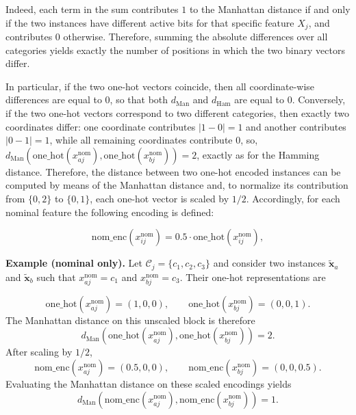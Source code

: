 Indeed, each term in the sum contributes $1$ to the Manhattan distance if and only if the two instances have different active bits for that specific feature $X_j$, and contributes $0$ otherwise. Therefore, summing the absolute differences over all categories yields exactly the number of positions in which the two binary vectors differ.

In particular, if the two one-hot vectors coincide, then all coordinate-wise differences are equal to $0$, so that both $d_{\mathrm{Man}}$ and $d_{\mathrm{Ham}}$ are equal to $0$. Conversely, if the two one-hot vectors correspond to two different categories, then exactly two coordinates differ: one coordinate contributes $|1-0|=1$ and another contributes $|0-1|=1$, while all remaining coordinates contribute $0$, so, $d_{\mathrm{Man}}\!\left(\mathrm{one\_hot}(x^{\mathrm{nom}}_{aj}),\mathrm{one\_hot}(x^{\mathrm{nom}}_{bj})\right)=2$, exactly as for the Hamming distance. Therefore, the distance between two one-hot encoded instances can be computed by means of the Manhattan distance and, to normalize its contribution from $\{0,2\}$ to $\{0,1\}$, each one-hot vector is scaled by $1/2$. Accordingly, for each nominal feature the following encoding is defined:

\begin{equation}
  \mathrm{nom\_enc}(x^{\mathrm{nom}}_{ij}) = 0.5 \cdot \mathrm{one\_hot}(x^{\mathrm{nom}}_{ij}),
\end{equation}

\medskip

\noindent\textbf{Example (nominal only).} Let $\mathcal{C}_j = \{c_1,c_2,c_3\}$ and consider two instances $\tilde{\mathbf{x}}_a$ and $\tilde{\mathbf{x}}_b$ such that $x^{\mathrm{nom}}_{aj} = c_1$ and $x^{\mathrm{nom}}_{bj} = c_3$. Their one-hot representations are

\begin{equation}
  \mathrm{one\_hot}(x^{\mathrm{nom}}_{aj}) = (1,0,0), \qquad \mathrm{one\_hot}(x^{\mathrm{nom}}_{bj}) = (0,0,1).
\end{equation}
The Manhattan distance on this unscaled block is therefore
\begin{equation}
  d_{\mathrm{Man}}\!\left(\mathrm{one\_hot}(x^{\mathrm{nom}}_{aj}),\mathrm{one\_hot}(x^{\mathrm{nom}}_{bj})\right) = 2.
\end{equation}
After scaling by $1/2$,
\begin{equation}
  \mathrm{nom\_enc}(x^{\mathrm{nom}}_{aj}) = (0.5,0,0), \qquad \mathrm{nom\_enc}(x^{\mathrm{nom}}_{bj}) = (0,0,0.5).
\end{equation}
Evaluating the Manhattan distance on these scaled encodings yields
\begin{equation}
  d_{\mathrm{Man}}\!\left(\mathrm{nom\_enc}(x^{\mathrm{nom}}_{aj}),\mathrm{nom\_enc}(x^{\mathrm{nom}}_{bj})\right) = 1.
\end{equation}

